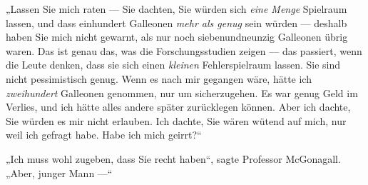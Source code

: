 „Lassen Sie mich raten — Sie dachten, Sie würden sich \emph{eine Menge} Spielraum lassen, und dass einhundert Galleonen \emph{mehr als genug} sein würden — deshalb haben Sie mich nicht gewarnt, als nur noch siebenundneunzig Galleonen übrig waren. Das ist genau das, was die Forschungsstudien zeigen — das passiert, wenn die Leute denken, dass sie sich einen \emph{kleinen} Fehlerspielraum lassen. Sie sind nicht pessimistisch genug. Wenn es nach mir gegangen wäre, hätte ich \emph{zweihundert} Galleonen genommen, nur um sicherzugehen. Es war genug Geld im Verlies, und ich hätte alles andere später zurücklegen können. Aber ich dachte, Sie würden es mir nicht erlauben. Ich dachte, Sie wären wütend auf mich, nur weil ich gefragt habe. Habe ich mich geirrt?“

„Ich muss wohl zugeben, dass Sie recht haben“, sagte Professor McGonagall.
„Aber, junger Mann —“

